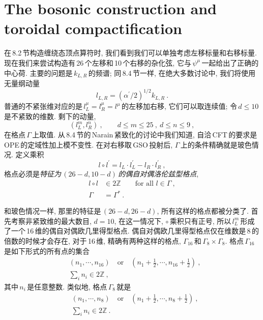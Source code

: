 \section{The bosonic construction and toroidal compactification}

在\,8.2\,节构造缠绕态顶点算符时, 我们看到我们可以单独考虑左移标量和右移标量. 现在我们来尝试构造有\,26\,个左移和\,10\,个右移的杂化弦, 它与$\,\psi^{\mu}\,$一起给出了正确的中心荷. 主要的问题是$\,k_{L,R}\,$的频谱; 同\,8.4\,节一样, 在绝大多数讨论中, 我们将使用无量纲动量
\begin{equation}
    l_{L,R} = (\alpha^{\prime}/2)^{1/2} k_{L,R} \:. \label{11.6.1}
\end{equation}
普通的不紧张维对应的是$\,l_{L}^{\mu}=l_{R}^{\mu}=l^{\mu}\,$的左移加右移, 它们可以取连续值; 令$\,d\leq 10\,$是不紧致的维数. 剩下的动量,
\begin{equation}
    (l_{L}^{m},l_{R}^{n}) \:, \qquad d\leq m \leq 25 \:, \: d\leq n \leq 9 \:, \label{11.6.2}
\end{equation}
在格点$\,\Gamma\,$上取值. 从\,8.4\,节的\,Narain\,紧致化的讨论中我们知道, 自洽\,CFT\,的要求是\,OPE\,的定域性加上模不变性. 在对右移取\,GSO\,投射后, $\Gamma\,$上的条件精确就是玻色情况. 定义乘积
\begin{equation}
    l \circ l^{\prime} = l_{L}\cdot l_{L}^{\prime} - l_{R} \cdot l_{R}^{\prime} \:, \label{11.6.3}
\end{equation}
格点必须是{\emph{特征为$\,(26-d,10-d)\,$的偶自对偶洛伦兹型格点}},
\begin{subequations}
\begin{align}
    l \circ l & \in 2\mathds{Z} \qquad \text{for all } l\in\Gamma \:, \label{11.6.4a} \\
    \Gamma &= \Gamma^{\ast} \:. \label{11.6.4b}
\end{align} \label{11.6.4}
\end{subequations}

和玻色情况一样, 那里的特征是$\,(26-d,26-d)$, 所有这样的格点都被分类了. 首先考察非紧致维的最大数目, $d=10$, 在这一情况下, $\circ\,$乘积只有正号, 所以$\,l_{L}^{m}\,$形成了一个\,16\,维的偶自对偶欧几里得型格点. 偶自对偶欧几里得型格点仅在维数是\,8\,的倍数的时候才会存在, 对于\,16\,维, 精确有两种这样的格点, $\Gamma_{16}\,$和$\,\Gamma_{8}\times \Gamma_{8}$. 格点$\,\Gamma_{16}\,$是如下形式的所有点的集合
\begin{subequations}
\begin{align}
    &(n_{1},\cdots,n_{16})\quad \text{or} \quad (n_{1}+\tfrac{1}{2},\cdots ,n_{16}+\tfrac{1}{2}) \:, \label{11.6.5a} \\
    &\sum_{i}n_{i} \in 2\mathds{Z} \:, \label{11.6.5b}
\end{align}  \label{11.6.5}
\end{subequations}
其中$\,n_{i}\,$是任意整数. 类似地, 格点$\,\Gamma_{8}\,$就是
\begin{subequations}
\begin{align}
    &(n_{1},\cdots,n_{8})\quad \text{or} \quad (n_{1}+\tfrac{1}{2},\cdots ,n_{8}+\tfrac{1}{2}) \:, \label{11.6.6a} \\
    &\sum_{i}n_{i} \in 2\mathds{Z} \:. \label{11.6.6b}
\end{align} \label{11.6.6}
\end{subequations}



